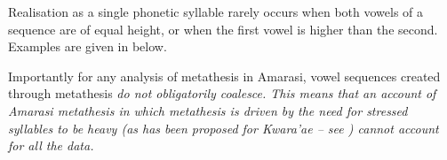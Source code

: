\begin{exe}
	\label{ex:/V.V/->[V.V]}
\end{exe}

Realisation as a single phonetic syllable
rarely occurs when both vowels
of a sequence are of equal height,
or when the first vowel is higher than the second.
Examples are given in  below.

\begin{exe}
	\label{ex:/V.V/->[V.V]2}
\end{exe}

Importantly for any analysis of metathesis in Amarasi,
vowel sequences created through metathesis \it{do not} obligatorily coalesce.
This means that an account of Amarasi metathesis
in which metathesis is driven by the need for stressed syllables to be heavy
(as has been proposed for Kwara'ae -- see )
cannot account for all the data.

